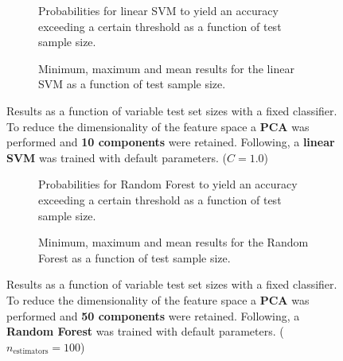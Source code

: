 \begin{figure}
    \captionsetup[subfigure]{justification=justified,singlelinecheck=false}
    \begin{subfigure}[t]{0.61\textwidth}
        
        \caption{Probabilities for linear SVM to yield an accuracy exceeding a certain threshold as a function of test sample size.}
    \end{subfigure}
    \hspace{3.0mm}
    \begin{subfigure}[t]{0.34\textwidth}
        
        \caption{Minimum, maximum and mean results for the linear SVM as a function of test sample size.}
    \end{subfigure}
    \caption[Effects of varying test sample size. Linear SVM; Preprocessing: PCA ($n_\text{components} = \num{10}$)]{Results as a function of variable test set sizes with a fixed classifier. To reduce the dimensionality of the feature space a \textbf{PCA} was performed and \textbf{10 components} were retained. Following, a \textbf{{linear SVM}} was trained with default parameters. ($C=\num{1.0}$)}
    \label{fig:PCA_10_components_no_selection_LinearSVC}
\end{figure}

\begin{figure}
    \captionsetup[subfigure]{justification=justified,singlelinecheck=false}
    \begin{subfigure}[t]{0.61\textwidth}
        
        \caption{Probabilities for Random Forest to yield an accuracy exceeding a certain threshold as a function of test sample size.}
    \end{subfigure}
    \hspace{3.0mm}
    \begin{subfigure}[t]{0.34\textwidth}
        
        \caption{Minimum, maximum and mean results for the Random Forest as a function of test sample size.}
    \end{subfigure}
    \caption[Effects of varying test sample size. Random Forest; Preprocessing: PCA ($n_\text{components} = \num{50}$)]{Results as a function of variable test set sizes with a fixed classifier. To reduce the dimensionality of the feature space a \textbf{PCA} was performed and \textbf{50 components} were retained. Following, a \textbf{{Random Forest}} was trained with default parameters. ($n_\text{estimators}=\num{100}$)}
    \label{fig:PCA_50_components_no_selection_RandomForest}
\end{figure}

